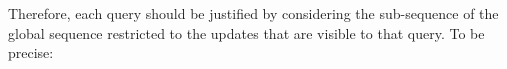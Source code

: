 Therefore, each query should be justified by considering the
sub-sequence of the global sequence restricted to the updates that are
visible to that query.
To be precise:
%
%
%
%
